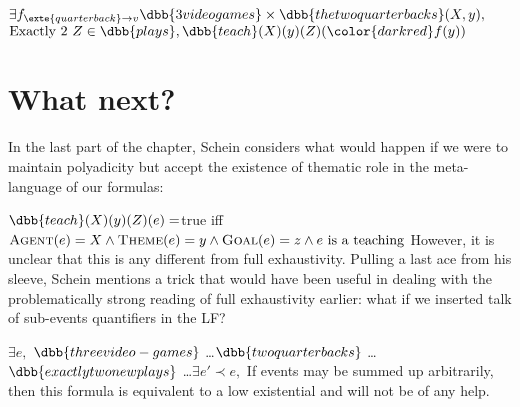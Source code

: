 \ex
$\exists f_{\exte{quarterback}\rightarrow v}\dbb{3 video games}\times \dbb{the two quarterbacks} (X, y),$\\
$\text{Exactly 2 } Z\in \dbb{plays},  \dbb{teach}(X)(y)(Z)({\color{darkred} f(y)})$
\xe
%

\section{What next?}

In the last part of the chapter, Schein considers what would happen if we were to maintain polyadicity but accept the existence of thematic role in the meta-language of our formulas:

\ex
$\dbb{teach}(X)(y)(Z)(e)=$true iff $\textsc{Agent}(e) = X \wedge \textsc{Theme}(e) = y \wedge \textsc{Goal}(e) = z\wedge e\text{ is a teaching}  $
\xe
%
However, it is unclear that this is any different from full exhaustivity. Pulling a last ace from his sleeve, Schein mentions a trick that would have been useful in dealing with the problematically strong reading of full exhaustivity earlier: what if we inserted talk of sub-events quantifiers in the LF?


\ex
$\exists e,$ $\dbb{three video-games}$ \ldots $\dbb{two quarterbacks}$ \ldots $\dbb{exactly two new plays}$ \ldots $\exists e'\prec e,$ 
\xe
%
If events may be summed up arbitrarily, then this formula is equivalent to a low existential and will not be of any help.



